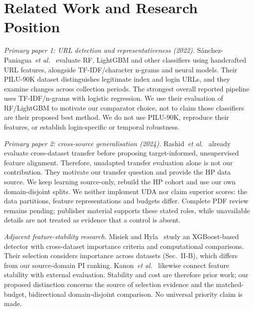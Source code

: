 \section{Related Work and Research Position}
\textit{Primary paper 1: URL detection and representativeness (2022).} S\'anchez-Paniagua~\textit{et al.}~\cite{sanchez2022} evaluate RF, LightGBM and other classifiers using handcrafted URL features, alongside TF-IDF/character n-grams and neural models. Their PILU-90K dataset distinguishes legitimate index and login URLs, and they examine changes across collection periods. The strongest overall reported pipeline uses TF-IDF/n-grams with logistic regression. We use their evaluation of RF/LightGBM to motivate our comparator choice, not to claim those classifiers are their proposed best method. We do not use PILU-90K, reproduce their features, or establish login-specific or temporal robustness.

\textit{Primary paper 2: cross-source generalisation (2024).} Rashid~\textit{et al.}~\cite{rashid2024} already evaluate cross-dataset transfer before proposing target-informed, unsupervised feature alignment. Therefore, unadapted transfer evaluation alone is not our contribution. They motivate our transfer question and provide the HP data source. We keep learning source-only, rebuild the HP cohort and use our own domain-disjoint splits. We neither implement UDA nor claim superior scores: the data partitions, feature representations and budgets differ. Complete PDF review remains pending; publisher material supports these stated roles, while unavailable details are not treated as evidence that a control is absent.

\textit{Adjacent feature-stability research.} Misiek and Hyla~\cite{misiek2026} study an XGBoost-based detector with cross-dataset importance criteria and computational comparisons. Their selection considers importance across datasets (Sec.~II-B), which differs from our source-domain PI ranking. Kanon~\textit{et al.}~\cite{kanon2026} likewise connect feature stability with external evaluation. Stability and cost are therefore prior work; our proposed distinction concerns the source of selection evidence and the matched-budget, bidirectional domain-disjoint comparison. No universal priority claim is made.

